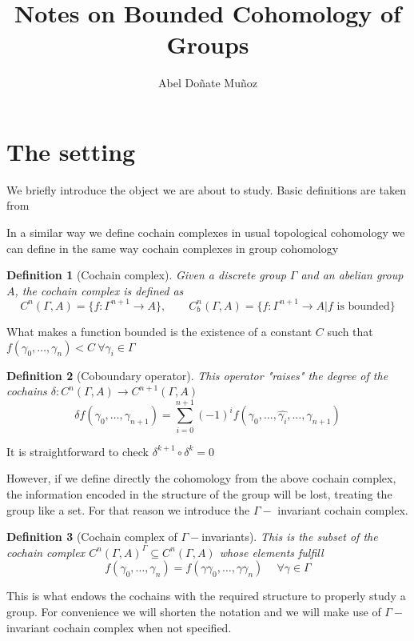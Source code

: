 \documentclass[leqno]{article}
\title{Notes on Bounded Cohomology of Groups}
\author{Abel Doñate Muñoz}
\date{}
\newtheorem*{definition}{Definition}
\begin{document}
\maketitle
\tableofcontents
\newpage

\section{The setting}
We briefly introduce the object we are about to study. Basic definitions are taken from \cite{frigerio}

In a similar way we define cochain complexes in usual topological cohomology we can define in the same way cochain complexes in group cohomology

\begin{definition}[Cochain complex] Given a discrete group $\Gamma $ and an abelian group $A$, the cochain complex is defined as
\[
  C^n(\Gamma , A) = \{f: \Gamma ^{n+1}\to A\} , \qquad C^n_{b} (\Gamma , A) = \{f:\Gamma ^{n+1}\to  A | f \text{ is bounded}\}
\] 
\end{definition}

What makes a function bounded is the existence of a constant $C$ such that  $f(\gamma_0, \ldots, \gamma_n)<C \ \forall \gamma_i\in \Gamma $

\begin{definition}[Coboundary operator] This operator "raises" the degree of the cochains $\delta: C^n(\Gamma , A)\to  C^{n+1}(\Gamma , A)$
\[
  \delta f(\gamma_0,\ldots, \gamma_{n+1}) = \sum_{i=0}^{n+1} (-1)^{i}f(\gamma_0, \ldots, \hat{\gamma_i}, \ldots, \gamma_{n+1})
\] 
\end{definition}

It is straightforward to check $\delta^{k+1} \circ \delta^k = 0$

However, if we define directly the cohomology from the above cochain complex, the information encoded in the structure of the group will be lost, treating the group like a set. For that reason we introduce the $\Gamma -$ invariant cochain complex.

\begin{definition}[Cochain complex of $\Gamma -$invariants] This is the subset of the cochain complex $C^n(\Gamma , A)^\Gamma \subseteq C^n(\Gamma , A)$ whose elements fulfill
  \[
  f(\gamma_0,\ldots, \gamma_n) = f(\gamma\gamma_0,\ldots, \gamma\gamma_n) \quad \ \forall \gamma \in \Gamma 
  \] 
\end{definition}
This is what endows the cochains with the required structure to properly study a group. For convenience we will shorten the notation and we will make use of $\Gamma -$invariant cochain complex when not specified.
\end{document}
